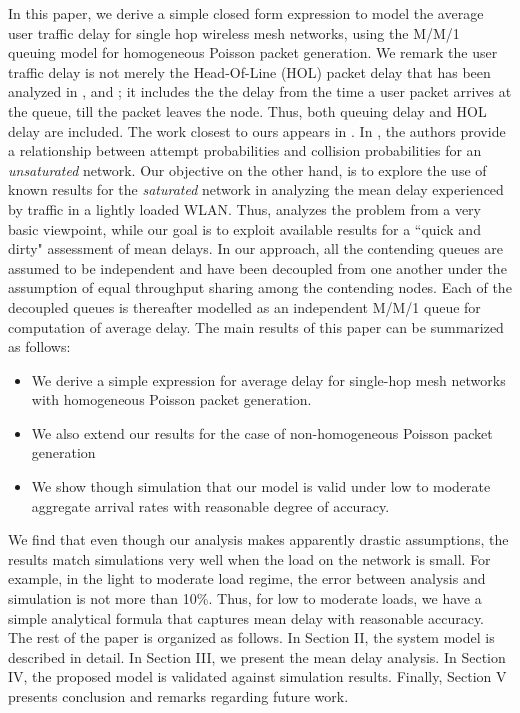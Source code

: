 \documentclass[10pt, conference, compsocconf]{IEEEtran}
\begin{document}
In this paper, we derive a simple closed form expression to model the average user traffic delay for single hop wireless mesh networks, 
using the M/M/1 queuing model for homogeneous Poisson packet generation. We remark the user traffic delay is not merely the Head-Of-Line (HOL) packet delay that has been analyzed in \cite{bianchi}, \cite{tay} and \cite{akumar}; it includes the the delay from the time a user packet arrives at the queue, till the packet leaves the node. Thus, both queuing delay and HOL delay are included. The work closest to ours appears in \cite{tobagi}. In \cite{tobagi}, the authors provide a relationship between attempt probabilities and collision probabilities for an \emph{unsaturated} network. Our objective on the other hand, is to explore the use of known results for the \emph{saturated} network in analyzing the mean delay experienced by traffic in a lightly loaded WLAN. Thus,  \cite{tobagi} analyzes the problem from a very basic viewpoint, while our goal is to exploit available results for a ``quick and dirty" assessment of mean delays. In our approach, all the contending queues are assumed to be independent and have been decoupled from one another under the assumption of equal throughput sharing among the contending nodes. Each of the decoupled queues is thereafter modelled as an independent M/M/1 queue for computation of average delay. The main results of this paper can be summarized as follows:

\begin{itemize}
\item We derive a simple expression for average delay for single-hop mesh networks with homogeneous Poisson packet generation.
\item We also extend our results for the case of non-homogeneous Poisson packet generation
\item We show though simulation that our model is valid under low to moderate aggregate arrival rates with reasonable degree of accuracy.
\end{itemize}

We find that even though our analysis makes apparently drastic assumptions, the results match simulations very well when the load on the network is small. For example, in the light to moderate load regime, the error between analysis and simulation is not more than 10\%. Thus, for low to moderate loads, we have a simple analytical formula that captures mean delay with reasonable accuracy. The rest of the paper is organized as follows. In Section II, the system model is described in detail. In Section III, we present the mean delay analysis. In Section IV, the proposed model is validated against simulation results. Finally, Section V presents conclusion and remarks regarding future work.
\end{document}
